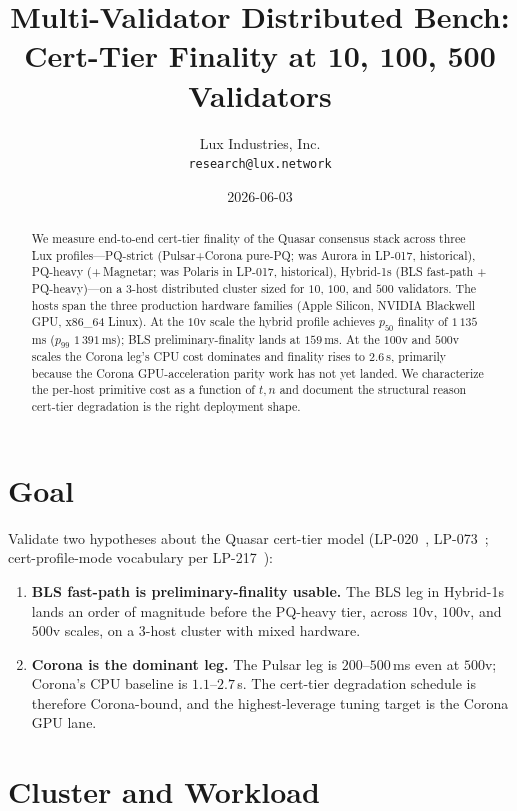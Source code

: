\documentclass[11pt,a4paper]{article}
\title{Multi-Validator Distributed Bench:\\
       Cert-Tier Finality at $\mathbf{10}$, $\mathbf{100}$, $\mathbf{500}$ Validators}
\author{Lux Industries, Inc. \\
        \texttt{research@lux.network}}
\date{2026-06-03}
\begin{document}
\maketitle

\begin{abstract}
We measure end-to-end cert-tier finality of the Quasar consensus
stack across three Lux profiles---PQ-strict (Pulsar+Corona pure-PQ;
was Aurora in LP-017, historical), PQ-heavy (+\,Magnetar; was Polaris
in LP-017, historical), Hybrid-1s (BLS fast-path + PQ-heavy)---on a
3-host distributed cluster sized for $10$, $100$, and $500$
validators. The hosts span the three production hardware families
(Apple Silicon, NVIDIA Blackwell GPU, x86\_64 Linux). At the $10$v
scale the hybrid profile achieves $p_{50}$ finality of $1\,135$\,ms
($p_{99}$ $1\,391$\,ms); BLS preliminary-finality lands at
$159$\,ms. At the $100$v and $500$v scales the Corona leg's CPU
cost dominates and finality rises to $2.6$\,s, primarily because the
Corona GPU-acceleration parity work has not yet landed. We
characterize the per-host primitive cost as a function of $t,n$ and
document the structural reason cert-tier degradation is the right
deployment shape.
\end{abstract}

\section{Goal}

Validate two hypotheses about the Quasar cert-tier model
(LP-020~\cite{lp020}, LP-073~\cite{lp073}; cert-profile-mode
vocabulary per LP-217~\cite{lp217}):

\begin{enumerate}[leftmargin=2em,nosep]
\item \textbf{BLS fast-path is preliminary-finality usable.} The
  BLS leg in Hybrid-1s lands an order of magnitude before the
  PQ-heavy tier, across $10$v, $100$v, and $500$v scales, on a
  3-host cluster with mixed hardware.
\item \textbf{Corona is the dominant leg.} The Pulsar leg is
  $200$--$500$\,ms even at $500$v; Corona's CPU baseline is
  $1.1$--$2.7$\,s. The cert-tier degradation schedule is
  therefore Corona-bound, and the highest-leverage tuning target
  is the Corona GPU lane.
\end{enumerate}

\section{Cluster and Workload}
\end{document}
